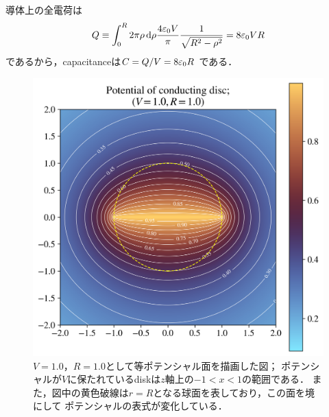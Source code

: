   導体上の全電荷は
  \begin{gather}%
    Q \equiv \int_0^R 2\pi \rho \dl{\rho} 
    \frac{4\eps_0 V}{\pi} \frac{1}{\sqrt{R^2  -\rho^2}} = 8\eps_0 VR
  \end{gather}%
  であるから，capacitanceは$C = Q/V = 8\varepsilon_0 R$
  である．
  \begin{figure}[htbp]%
    \centering%
    \includegraphics[width=0.5\linewidth]{py/3-3_normal_w_circle.png}%
    \caption{$V=1.0$，$R = 1.0$として等ポテンシャル面を描画した図；
    ポテンシャルが$V$に保たれているdiskは$z$軸上の$-1 < x <1$の範囲である．
    また，図中の黄色破線は$r = R$となる球面を表しており，この面を境にして
    ポテンシャルの表式が変化している．}%
    \label{fig:3-3_normal_w_circle}%
  \end{figure}%

